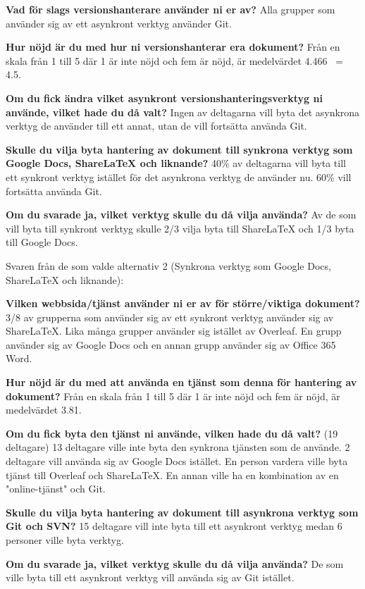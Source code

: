 \textbf{Vad för slags versionshanterare använder ni er av?}
Alla grupper som använder sig av ett asynkront verktyg använder Git.

\textbf{Hur nöjd är du med hur ni versionshanterar era dokument?}
Från en skala från 1 till 5 där 1 är inte nöjd och fem är nöjd, är medelvärdet 4.466 ~= 4.5.

\textbf{Om du fick ändra vilket asynkront versionshanteringsverktyg ni använde, vilket hade du då valt?}
Ingen av deltagarna vill byta det asynkrona verktyg de använder till ett annat, utan de vill fortsätta använda Git.

\textbf{Skulle du vilja byta hantering av dokument till synkrona verktyg som Google Docs, ShareLaTeX och liknande?}
40\% av deltagarna vill byta till ett synkront verktyg istället för det asynkrona verktyg de använder nu. 60\% vill fortsätta använda Git.

\textbf{Om du svarade ja, vilket verktyg skulle du då vilja använda?}
Av de som vill byta till synkront verktyg skulle 2/3 vilja byta till ShareLaTeX och 1/3 byta till Google Docs.


Svaren från de som valde alternativ 2 (Synkrona verktyg som Google Docs, ShareLaTeX och liknande):

\textbf{Vilken webbsida/tjänst använder ni er av för större/viktiga dokument?}
3/8 av grupperna som använder sig av ett synkront verktyg använder sig av ShareLaTeX. Lika många grupper använder sig istället av Overleaf. En grupp använder sig av Google Docs och en annan grupp använder sig av Office 365 Word. 


\textbf{Hur nöjd är du med att använda en tjänst som denna för hantering av dokument?}
Från en skala från 1 till 5 där 1 är inte nöjd och fem är nöjd, är medelvärdet 3.81.

\textbf{Om du fick byta den tjänst ni använde, vilken hade du då valt?} (19 deltagare)
13 deltagare ville inte byta den synkrona tjänsten som de använde. 2 deltagare vill använda sig av Google Docs istället. En person vardera ville byta tjänst till Overleaf och ShareLaTeX. En annan ville ha en kombination av en "online-tjänst" och Git.

\textbf{Skulle du vilja byta hantering av dokument till asynkrona verktyg som Git och SVN?}
15 deltagare vill inte byta till ett asynkront verktyg medan 6 personer ville byta verktyg.

\textbf{Om du svarade ja, vilket verktyg skulle du då vilja använda?}
De som ville byta till ett asynkront verktyg vill använda sig av Git istället.

